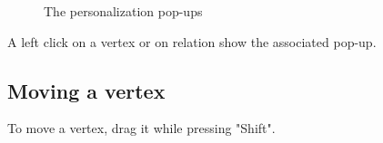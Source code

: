 \begin{figure}[h!]
\centering
{}
\hspace*{35pt}

\caption{The personalization pop-ups}
\label{popup}
\end{figure}

A left click on a vertex or on relation show the associated pop-up.\\

\subsection{Moving a vertex}
To move a vertex, drag it while pressing "Shift".\\

